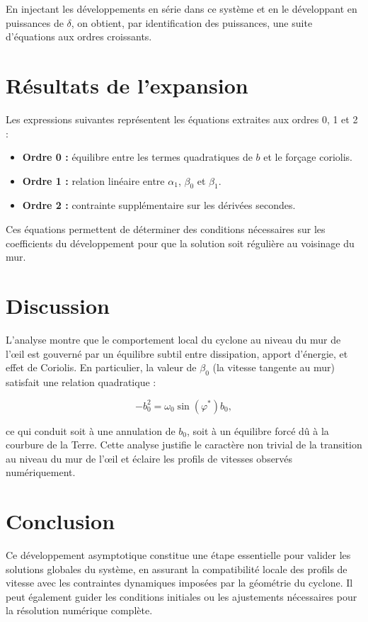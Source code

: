 En injectant les développements en série dans ce système et en le développant en puissances de $\delta$, on obtient, par identification des puissances, une suite d’équations aux ordres croissants.

\section{Résultats de l’expansion}

Les expressions suivantes représentent les équations extraites aux ordres 0, 1 et 2 :

\begin{itemize}
    \item \textbf{Ordre 0 :} équilibre entre les termes quadratiques de $b$ et le forçage coriolis.
    \item \textbf{Ordre 1 :} relation linéaire entre $\alpha_1$, $\beta_0$ et $\beta_1$.
    \item \textbf{Ordre 2 :} contrainte supplémentaire sur les dérivées secondes.
\end{itemize}

Ces équations permettent de déterminer des conditions nécessaires sur les coefficients du développement pour que la solution soit régulière au voisinage du mur.

\section{Discussion}

L’analyse montre que le comportement local du cyclone au niveau du mur de l’œil est gouverné par un équilibre subtil entre dissipation, apport d’énergie, et effet de Coriolis. En particulier, la valeur de $\beta_0$ (la vitesse tangente au mur) satisfait une relation quadratique :

\[
-b_0^2 = \omega_0 \sin(\varphi^*) b_0,
\]

ce qui conduit soit à une annulation de $b_0$, soit à un équilibre forcé dû à la courbure de la Terre. Cette analyse justifie le caractère non trivial de la transition au niveau du mur de l’œil et éclaire les profils de vitesses observés numériquement.

\section*{Conclusion}

Ce développement asymptotique constitue une étape essentielle pour valider les solutions globales du système, en assurant la compatibilité locale des profils de vitesse avec les contraintes dynamiques imposées par la géométrie du cyclone. Il peut également guider les conditions initiales ou les ajustements nécessaires pour la résolution numérique complète.

